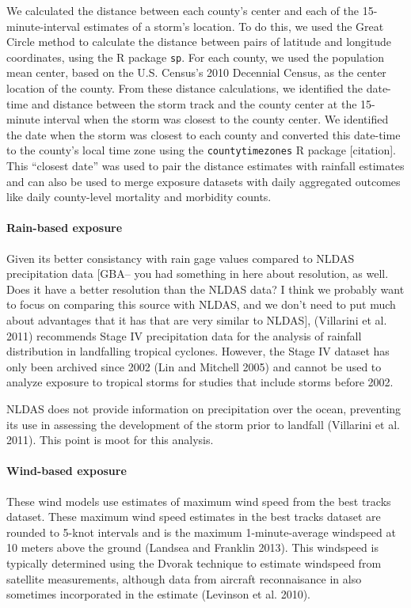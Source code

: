 \documentclass[]{elsarticle} %
\begin{document}
We calculated the distance between each county's center and each of the
15-minute-interval estimates of a storm's location. To do this, we used
the Great Circle method to calculate the distance between pairs of
latitude and longitude coordinates, using the R package \texttt{sp}. For
each county, we used the population mean center, based on the U.S.
Census's 2010 Decennial Census, as the center location of the county.
From these distance calculations, we identified the date-time and
distance between the storm track and the county center at the 15-minute
interval when the storm was closest to the county center. We identified
the date when the storm was closest to each county and converted this
date-time to the county's local time zone using the
\texttt{countytimezones} R package {[}citation{]}. This ``closest date''
was used to pair the distance estimates with rainfall estimates and can
also be used to merge exposure datasets with daily aggregated outcomes
like daily county-level mortality and morbidity counts.

\paragraph{Rain-based exposure}\label{rain-based-exposure}

Given its better consistancy with rain gage values compared to NLDAS
precipitation data {[}GBA-- you had something in here about resolution,
as well. Does it have a better resolution than the NLDAS data? I think
we probably want to focus on comparing this source with NLDAS, and we
don't need to put much about advantages that it has that are very
similar to NLDAS{]}, (Villarini et al. 2011) recommends Stage IV
precipitation data for the analysis of rainfall distribution in
landfalling tropical cyclones. However, the Stage IV dataset has only
been archived since 2002 (Lin and Mitchell 2005) and cannot be used to
analyze exposure to tropical storms for studies that include storms
before 2002.

NLDAS does not provide information on precipitation over the ocean,
preventing its use in assessing the development of the storm prior to
landfall (Villarini et al. 2011). This point is moot for this analysis.

\paragraph{Wind-based exposure}\label{wind-based-exposure}

These wind models use estimates of maximum wind speed from the best
tracks dataset. These maximum wind speed estimates in the best tracks
dataset are rounded to 5-knot intervals and is the maximum
1-minute-average windspeed at 10 meters above the ground (Landsea and
Franklin 2013). This windspeed is typically determined using the Dvorak
technique to estimate windspeed from satellite measurements, although
data from aircraft reconnaisance in also sometimes incorporated in the
estimate (Levinson et al. 2010).
\end{document}

